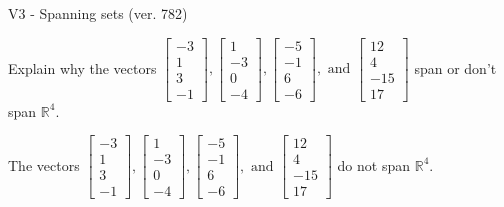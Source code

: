 \begin{exercise}
  \begin{exerciseTitle}V3 - Spanning sets (ver. 782)\end{exerciseTitle}
  \begin{exerciseStatement}
    Explain why the vectors \(\left[\begin{array}{r}
-3 \\
1 \\
3 \\
-1
\end{array}\right] , \left[\begin{array}{r}
1 \\
-3 \\
0 \\
-4
\end{array}\right] , \left[\begin{array}{r}
-5 \\
-1 \\
6 \\
-6
\end{array}\right] , \text{ and } \left[\begin{array}{r}
12 \\
4 \\
-15 \\
17
\end{array}\right]\) span or don't span \(\mathbb{R}^4\). 
	


  \end{exerciseStatement}
  \begin{exerciseAnswer}
   The vectors \(\left[\begin{array}{r}
-3 \\
1 \\
3 \\
-1
\end{array}\right] , \left[\begin{array}{r}
1 \\
-3 \\
0 \\
-4
\end{array}\right] , \left[\begin{array}{r}
-5 \\
-1 \\
6 \\
-6
\end{array}\right] , \text{ and } \left[\begin{array}{r}
12 \\
4 \\
-15 \\
17
\end{array}\right]\) 
  	 do not  
	span \(\mathbb{R}^4\).
  


  \end{exerciseAnswer}
\end{exercise}